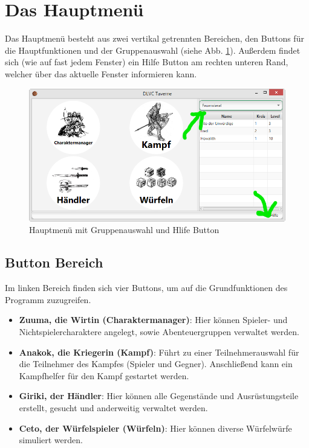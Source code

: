\documentclass[11pt, a4paper, german]{article}
\begin{document}
\section{Das Hauptmenü}
Das Hauptmenü besteht aus zwei vertikal getrennten Bereichen, den Buttons für die Hauptfunktionen und der Gruppenauswahl (siehe Abb. \ref{fig:Hauptmenue1}). Außerdem findet sich (wie auf fast jedem Fenster) ein Hilfe Button am rechten unteren Rand, welcher über das aktuelle Fenster informieren kann.
\begin{figure}
\centering
\includegraphics[width=1\linewidth]{Bilder/Hauptmenue1}
\caption{Hauptmenü mit Gruppenauswahl und Hlife Button}
\label{fig:Hauptmenue1}
\end{figure}

\subsection{Button Bereich}
Im linken Bereich finden sich vier Buttons, um auf die Grundfunktionen des Programm zuzugreifen.
\begin{itemize}
	\item[] \textbf{Zuuma, die Wirtin (Charaktermanager)}: Hier können Spieler- und Nichtspielercharaktere angelegt, sowie Abenteuergruppen verwaltet werden.
	\item[] \textbf{Anakok, die Kriegerin (Kampf)}: Führt zu einer Teilnehmerauswahl für die Teilnehmer des Kampfes (Spieler und Gegner). Anschließend kann ein Kampfhelfer für den Kampf gestartet werden.
	\item[] \textbf{Giriki, der Händler}: Hier können alle Gegenstände und Ausrüstungsteile erstellt, gesucht und anderweitig verwaltet werden.
	\item[] \textbf{Ceto, der Würfelspieler (Würfeln)}: Hier können diverse Würfelwürfe simuliert werden.
\end{itemize}
\end{document}
